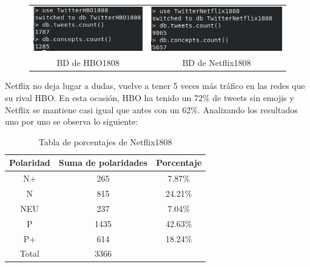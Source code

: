 \begin{figure}[H]
	\centering
	\begin{tabular}{c c}
		
		\includegraphics[scale=.7]{imagenes/HBO1808Mongo.png}
		&  \includegraphics[scale=.7]{imagenes/Netflix1808Mongo.png} \\ 
		
		{BD de HBO1808}
		
		&  {BD de Netflix1808} \\ 
		
	\end{tabular} 
	\label{fig:Mongo1808}
\end{figure}

Netflix no deja lugar a dudas, vuelve a tener 5 veces más tráfico en las redes que su rival HBO. 
En esta ocasión, HBO ha tenido un 72\% de tweets sin emojis y Netflix se mantiene casi igual que antes con un 62\%. Analizando los resultados uno por uno se observa lo siguiente: 

\begin{table}[H]
	\centering
	\begin{tabular}{|c|c|c|}
		\hline 
		Polaridad& Suma de polaridades & Porcentaje \\ 
		\hline 
		N+& 265 & 7.87\% \\ 
		\hline 
		N& 815 &  24.21\%\\ 
		\hline 
		NEU& 237 & 7.04\% \\ 
		\hline 
		P& 1435 & 42.63\% \\ 
		\hline 
		P+& 614 & 18.24\% \\ 
		\hline 
		Total & 3366 & \\
		\hline
	\end{tabular} 
	\caption{Tabla de porcentajes de Netflix1808}
	\label{tbl:porcentaje-Netflix1808}
\end{table}

